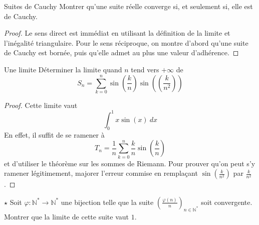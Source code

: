 \documentclass[french,a4paper]{article}
\newcommand{\N}{\mathbb{N}}
\newcommand{\st}{^*}
\theoremstyle{plain}
\theoremstyle{definition}
\theoremstyle{remark}
\begin{document}
\begin{ex}{Suites de Cauchy}
	Montrer qu'une suite réelle converge si, et seulement si, elle est de Cauchy.
\end{ex}

\begin{proof}
	Le sens direct est immédiat en utilisant la définition de la limite et l'inégalité triangulaire. Pour le sens réciproque, on montre d'abord qu'une suite de Cauchy est bornée, puis qu'elle admet au plus une valeur d'adhérence.
\end{proof}

\begin{ex}{Une limite}
	Déterminer la limite quand $n$ tend vers $+\infty$ de $$S_n=\sum_{k=0}^{n}\sin\left(\frac{k}{n}\right)\sin\left(\left(\frac{k}{n^2}\right)\right)$$
\end{ex}
\begin{proof}
	Cette limite vaut $$\int_{0}^{1}x\sin(x)\ dx$$ En effet, il suffit de se ramener à $$T_n=\frac{1}{n}\sum_{k=0}^{n}\frac{k}{n}\sin\left(\frac{k}{n}\right)$$ et d'utiliser le théorème sur les sommes de Riemann. Pour prouver qu'on peut s'y ramener légitimement, majorer l'erreur commise en remplaçant $\displaystyle\sin\left(\frac{k}{n^2}\right)$ par $\displaystyle\frac{k}{n^2}$.
\end{proof}

\begin{ex}[Morlot]{$\star$}
	Soit $\varphi:\N\st\to\N\st$ une bijection telle que la suite $\displaystyle\left(\frac{\varphi(n)}{n}\right)_{n\in\N\st}$ soit convergente. Montrer que la limite de cette suite vaut $1$.
\end{ex}
\end{document}
